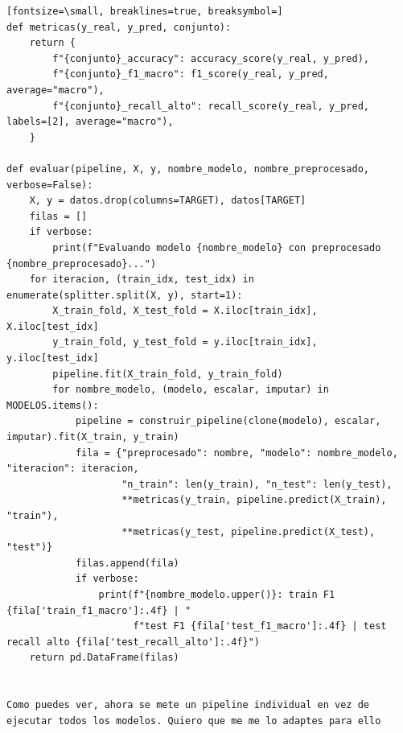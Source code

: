 \documentclass[12pt,a4paper,oneside]{book}
\begin{document}
\begin{iaprompt}
\begin{Verbatim}[fontsize=\small, breaklines=true, breaksymbol=]
def metricas(y_real, y_pred, conjunto):
    return {
        f"{conjunto}_accuracy": accuracy_score(y_real, y_pred),
        f"{conjunto}_f1_macro": f1_score(y_real, y_pred, average="macro"),
        f"{conjunto}_recall_alto": recall_score(y_real, y_pred, labels=[2], average="macro"),
    }

def evaluar(pipeline, X, y, nombre_modelo, nombre_preprocesado, verbose=False):
    X, y = datos.drop(columns=TARGET), datos[TARGET]
    filas = []
    if verbose:
        print(f"Evaluando modelo {nombre_modelo} con preprocesado {nombre_preprocesado}...")
    for iteracion, (train_idx, test_idx) in enumerate(splitter.split(X, y), start=1):
        X_train_fold, X_test_fold = X.iloc[train_idx], X.iloc[test_idx]
        y_train_fold, y_test_fold = y.iloc[train_idx], y.iloc[test_idx]
        pipeline.fit(X_train_fold, y_train_fold)
        for nombre_modelo, (modelo, escalar, imputar) in MODELOS.items():
            pipeline = construir_pipeline(clone(modelo), escalar, imputar).fit(X_train, y_train)
            fila = {"preprocesado": nombre, "modelo": nombre_modelo, "iteracion": iteracion,
                    "n_train": len(y_train), "n_test": len(y_test),
                    **metricas(y_train, pipeline.predict(X_train), "train"),
                    **metricas(y_test, pipeline.predict(X_test), "test")}
            filas.append(fila)
            if verbose:
                print(f"{nombre_modelo.upper()}: train F1 {fila['train_f1_macro']:.4f} | "
                      f"test F1 {fila['test_f1_macro']:.4f} | test recall alto {fila['test_recall_alto']:.4f}")
    return pd.DataFrame(filas)


Como puedes ver, ahora se mete un pipeline individual en vez de ejecutar todos los modelos. Quiero que me me lo adaptes para ello 
\end{Verbatim}
\end{iaprompt}
\end{document}
